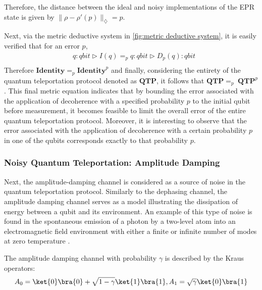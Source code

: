 Therefore, the distance between the ideal and noisy implementations of the EPR state is given by $\lVert \rho-\rho'(p) \rVert_{\diamondsuit} = p$.

Next, via the metric deductive system in \autoref{fig:metric deductive system}, it is easily verified that for an error $p$,
\begin{equation}
\begin{split}
    &q: \textit{qbit}  \triangleright  I (q) =_{p} q: \textit{qbit} \triangleright D_{p} (q)  : \textit{qbit} \\    
\end{split}
\end{equation}
Therefore $\textbf{Identity} =_{p} \textbf{Identity}^{p}$ and finally, considering the entirety of the quantum teleportation protocol denoted as $\textbf{QTP}$, it follows that $\textbf{QTP} =_{p} \hspace{3pt}\textbf{QTP}^{p}$. This final metric equation indicates that by bounding the error associated with the application of decoherence with a specified probability $p$ to the initial qubit before measurement, it becomes feasible to limit the overall error of the entire quantum teleportation protocol. Moreover, it is interesting to observe that the error associated with the application of decoherence with a certain probability $p$ in one of the qubits corresponds exactly to that probability $p$.

\subsubsection{Noisy Quantum Teleportation: Amplitude Damping}
Next, the amplitude-damping channel is considered as a source of noise in the quantum teleportation protocol. Similarly to the dephasing channel, the amplitude damping channel serves as a model illustrating the dissipation of energy between a qubit and its environment. An example of this type of noise is found in the spontaneous emission of a photon by a two-level atom into an electromagnetic field environment with either a finite or infinite number of modes at zero temperature \cite{salles2008experimental, Wang_2011}.


The amplitude damping channel with probability $\gamma$ is described by the Kraus operators:
\begin{equation}
     A_{0}= \ket{0} \bra{0} + \sqrt{1-\gamma} \ket{1} \bra{1} ,  A_{1}= \sqrt{\gamma} \ket{0} \bra{1}
\end{equation}

